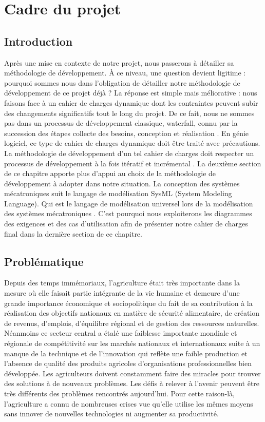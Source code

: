 
\chapter{ Cadre du projet }
\clearpage
\section*{Introduction }
Après une mise en contexte de notre projet, nous passerons à détailler sa méthodologie de développement.
\`A ce niveau, une question devient ligitime : pourquoi sommes nous dans l'obligation de détailler notre méthodologie de développement de ce projet déjà ?
La réponse est simple mais méliorative : nous faisons face à un cahier de charges dynamique dont les contraintes peuvent subir des changements significatifs tout le long du projet. 
De ce fait, nous ne sommes pas dans un processus de développement classique, waterfall, connu par la succession des étapes collecte des besoins, conception et réalisation \cite{SoftwareEngeneering1}.
En génie logiciel, ce type de cahier de charges dynamique doit être traité avec précautions.
La méthodologie de développement d'un tel cahier de charges doit respecter un processus de développement à la fois itératif et incrémental \cite{SoftwareEngeneering3,SoftwareEngeneering2}.
La deuxième section de ce chapitre apporte plus d'appui au choix de la méthodologie de développement à adopter dans notre situation.
La conception des systèmes mécatroniques suit le langage de modélisation SysML (System Modeling Language). Qui est le langage de modélisation universel lors de la modélisation des systèmes mécatroniques . C'est pourquoi nous exploiterons les diagrammes des exigences et des cas d'utilisation afin de présenter notre cahier de charges final dans la dernière section de ce chapitre.

\section{Problématique }
Depuis des temps immémoriaux, l'agriculture était très importante dans la mesure où elle faisait partie intégrante de la vie humaine et demeure d'une grande importance économique et sociopolitique du fait de sa contribution à la réalisation des objectifs nationaux en matière de sécurité alimentaire, de création de revenus, d'emplois, d'équilibre régional et de gestion des ressources naturelles. Néanmoins ce secteur central a étalé une faiblesse importante mondiale et régionale de compétitivité sur les marchés nationaux et internationaux suite à un manque de la technique et de l'innovation qui reflète une faible production et l'absence de qualité des produits agricoles d'organisations professionnelles bien développée. Les agriculteurs doivent constamment faire des miracles pour trouver des solutions à de nouveaux problèmes. Les défis à relever à l'avenir peuvent être très différents des problèmes rencontrés aujourd'hui. Pour cette raison-là, l'agriculture a connu de nombreuses crises vue qu'elle utilise les mêmes moyens sans innover de nouvelles technologies ni augmenter sa productivité.

